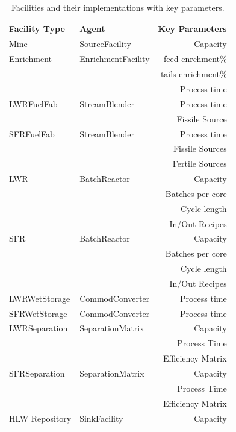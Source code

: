 \begin{frame}[fragile]
\footnotesize{
\begin{table}
\centering
\begin{tabular}{|l|l|r|}
\hline
\textbf{Facility Type} &\textbf{Agent} & \textbf{Key Parameters}\\
\hline
Mine & SourceFacility & Capacity\\
\hline
Enrichment & EnrichmentFacility & feed enrchment\% \\
& & tails enrichment\% \\
& & Process time \\
\hline
LWRFuelFab & StreamBlender & Process time\\
& & Fissile Source\\
\hline
SFRFuelFab & StreamBlender  & Process time\\
& & Fissile Sources\\
& & Fertile Sources\\
\hline
LWR & BatchReactor & Capacity \\
& & Batches per core \\
& & Cycle length\\
& & In/Out Recipes \\
\hline
SFR & BatchReactor & Capacity\\
& & Batches per core \\
& & Cycle length\\
& & In/Out Recipes \\
\hline
LWRWetStorage & CommodConverter & Process time\\
\hline
SFRWetStorage & CommodConverter & Process time\\
\hline
LWRSeparation & SeparationMatrix & Capacity\\
& & Process Time\\
& & Efficiency Matrix\\
\hline
SFRSeparation & SeparationMatrix & Capacity\\
& & Process Time\\
& & Efficiency Matrix\\
\hline
HLW Repository & SinkFacility & Capacity \\
\hline
\end{tabular}
\caption{Facilities and their implementations with key parameters.}
\label{tab:facimpl}
\end{table}
}
\end{frame}
